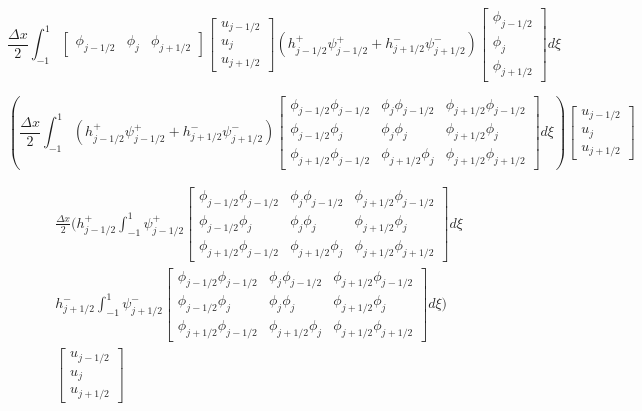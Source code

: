\begin{equation}
\frac{\Delta x}{2}\int_{-1 }^{1}  \begin{bmatrix}
\phi_{j-1/2} &\phi_j  &\phi_{j+1/2}
\end{bmatrix} \begin{bmatrix}
u_{j-1/2}\\u_j \\u _{j+1/2}
\end{bmatrix} \left(h^+_{j-1/2}\psi^+_{j-1/2}  + h^-_{j+1/2}\psi^-_{j+1/2}\right) \begin{bmatrix}
\phi_{j-1/2}\\\phi_j \\\phi_{j+1/2}
\end{bmatrix} d\xi
\end{equation}

\begin{equation}
\left(\frac{\Delta x}{2}\int_{-1 }^{1} \left(h^+_{j-1/2}\psi^+_{j-1/2}  + h^-_{j+1/2}\psi^-_{j+1/2}\right) \begin{bmatrix}
\phi_{j-1/2} \phi_{j-1/2} & \phi_{j}  \phi_{j-1/2}  & \phi_{j+1/2} \phi_{j-1/2}\\\phi_{j-1/2} \phi_{j} & \phi_{j} \phi_{j} &  \phi_{j + 1/2} \phi_{j}\\\phi_{j+1/2} \phi_{j-1/2} &  \phi_{j+1/2} \phi_{j} & \phi_{j+1/2} \phi_{j+1/2}
\end{bmatrix} d\xi \right) \begin{bmatrix}
u_{j-1/2}\\u_j \\u _{j+1/2}
\end{bmatrix}
\end{equation}

\begin{multline}
\frac{\Delta x}{2}\Bigg( h^+_{j-1/2} \int_{-1 }^{1} \psi^+_{j-1/2}  \begin{bmatrix}
\phi_{j-1/2} \phi_{j-1/2} & \phi_{j}  \phi_{j-1/2}  & \phi_{j+1/2} \phi_{j-1/2}\\\phi_{j-1/2} \phi_{j} & \phi_{j} \phi_{j} &  \phi_{j + 1/2} \phi_{j}\\\phi_{j+1/2} \phi_{j-1/2} &  \phi_{j+1/2} \phi_{j} & \phi_{j+1/2} \phi_{j+1/2}
\end{bmatrix} d\xi  \\  h^-_{j+1/2}\int_{-1 }^{1} \psi^-_{j+1/2} \begin{bmatrix}
\phi_{j-1/2} \phi_{j-1/2} & \phi_{j}  \phi_{j-1/2}  & \phi_{j+1/2} \phi_{j-1/2}\\\phi_{j-1/2} \phi_{j} & \phi_{j} \phi_{j} &  \phi_{j + 1/2} \phi_{j}\\\phi_{j+1/2} \phi_{j-1/2} &  \phi_{j+1/2} \phi_{j} & \phi_{j+1/2} \phi_{j+1/2}
\end{bmatrix} d\xi \Bigg) \\  \begin{bmatrix}
u_{j-1/2}\\u_j \\u _{j+1/2}
\end{bmatrix}
\end{multline}

